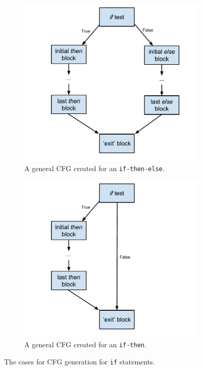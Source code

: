 \documentclass[12pt, titlepage]{article}
\begin{document}
\begin{figure}[t]
    \centering
    \begin{subfigure}[t]{0.5\textwidth}
        \centering
        \hspace*{-0.65in}
        \includegraphics[scale=0.6]{images/cfgIfthenelse.pdf}
        \caption{A general CFG created for \newline an \texttt{if-then-else}.}
    \end{subfigure}%
    \begin{subfigure}[t]{0.5\textwidth}
        \centering
        \includegraphics[scale=0.6]{images/cfgIfthen.pdf}
        \caption{A general CFG created for an \texttt{if-then}.}
    \end{subfigure}
    \caption{The cases for CFG generation for \texttt{if} statements.}
    \label{fig:ifcfgs}
\end{figure}
\end{document}
